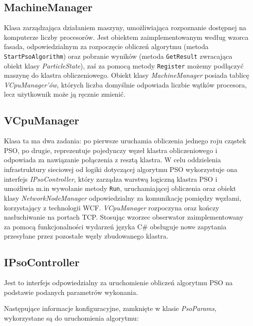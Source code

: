 \documentclass[12pt, twoside, openany, abstract=on]{report}
\theoremstyle{definition}
\begin{document}
\subsection{MachineManager}
Klasa zarządzająca działaniem maszyny, umożliwiająca rozpoznanie dostępnej na komputerze liczby procesorów. Jest obiektem zaimplementowanym według wzorca fasada, odpowiedzialnym za rozpoczęcie obliczeń algorytmu \newline (metoda \texttt{StartPsoAlgorithm}) oraz pobranie wyników (metoda \texttt{GetResult} zwracająca obiekt klasy \textit{ParticleState}), zaś za pomocą metody \texttt{Register} możemy podłączyć maszynę do klastra obliczeniowego. Obiekt klasy \textit{MachineManager} posiada tablicę \textit{VCpuManager'ów}, których liczba domyślnie odpowiada liczbie wątków procesora, lecz użytkownik może ją ręcznie zmienić.

\subsection{VCpuManager}
Klasa ta ma dwa zadania: 
po pierwsze uruchamia obliczenia jednego roju cząstek PSO, po drugie, reprezentuje pojedynczy węzeł klastra obliczeniowego i odpowiada za nawiązanie połączenia z resztą klastra. W celu oddzielenia infrastruktury sieciowej od logiki dotyczącej algorytmu PSO wykorzystuje ona interfejs \textit{IPsoController}, który zarządza warstwą logiczną klastra PSO i umożliwia m.in wywołanie metody \texttt{Run}, uruchamiającej obliczenia oraz obiekt klasy \textit{NetworkNodeManager} odpowiedzialny za komunikację pomiędzy węzłami, korzystający z technologii WCF. \textit{VCpuManager} rozpoczyna oraz kończy nasłuchiwanie na portach TCP. Stosując wzorzec obserwator zaimplementowany za pomocą funkcjonalności wydarzeń języka C\# obsługuje nowe zapytania przesyłane przez pozostałe węzły zbudowanego klastra.

\subsection{IPsoController}
Jest to interfejs odpowiedzialny za uruchomienie obliczeń algorytmu PSO na podstawie podanych parametrów wykonania.

Następujące informacje konfiguracyjne, zamknięte w klasie \textit{PsoParams}, wykorzystane są do uruchomienia algorytmu:  
\end{document}
